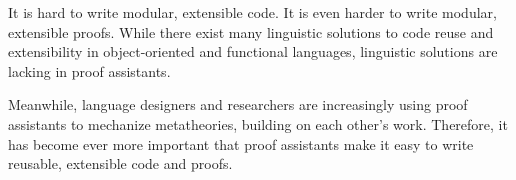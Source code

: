 
It is hard to write modular, extensible code.
It is even harder to write modular, extensible proofs.
While there exist many linguistic solutions to code reuse and
extensibility in object-oriented and functional languages,
linguistic solutions are lacking in proof assistants.

Meanwhile, language designers and researchers are increasingly
using proof assistants to mechanize meta\-theories, building on each
other's work.
Therefore, it has become ever more important that proof assistants
make it easy to write reusable, extensible code and proofs.